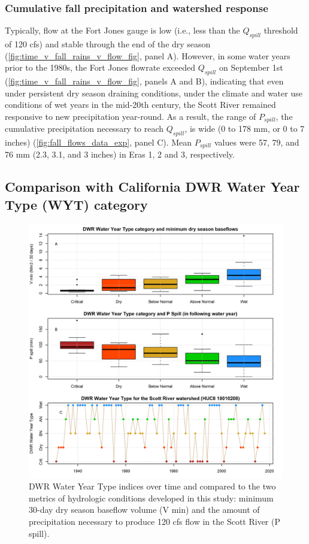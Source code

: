 \documentclass[hess, manuscript]{copernicus}
\begin{document}
\subsubsection{Cumulative fall precipitation and watershed response}

Typically, flow at the Fort Jones gauge is low (i.e., less than the
\(Q_{spill}\) threshold of 120 cfs) and stable through the end of the
dry season (\autoref{fig:time_v_fall_rains_v_flow_fig}, panel A).
However, in some water years prior to the 1980s, the Fort Jones flowrate
exceeded \(Q_{spill}\) on September 1st
(\autoref{fig:time_v_fall_rains_v_flow_fig}, panels A and B), indicating
that even under persistent dry season draining conditions, under the
climate and water use conditions of wet years in the mid-20th century,
the Scott River remained responsive to new precipitation year-round. As
a result, the range of \(P_{spill}\), the cumulative precipitation
necessary to reach \(Q_{spill}\), is wide (0 to 178 mm, or 0 to 7
inches) (\autoref{fig:fall_flows_data_exp}, panel C). Mean \(P_{spill}\)
values were 57, 79, and 76 mm (2.3, 3.1, and 3 inches) in Eras 1, 2 and
3, respectively.

\subsection{Comparison with California DWR Water Year Type (WYT)
category}

\begin{figure}
\includegraphics[width=1\linewidth]{f07} \caption{\label{fig:resp_vars_wyt} DWR Water Year Type indices over time and compared to the two metrics of hydrologic conditions developed in this study: minimum 30-day dry season baseflow volume (V min) and the amount of precipitation necessary to produce 120 cfs flow in the Scott River (P spill).}\label{fig:resp_vars_wyt}
\end{figure}
\end{document}
